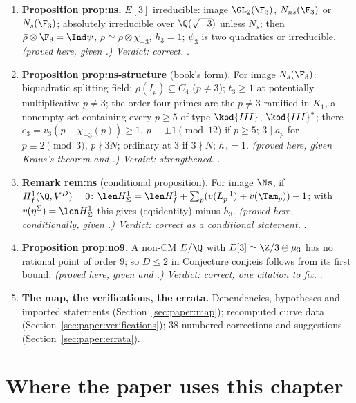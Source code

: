 \begin{sloppypar}
\begin{enumerate}[label=\textbf{\thechapter.\arabic*}]
{strengthened.} .
\item \textbf{Proposition prop:ns.} $E[3]$ irreducible: image $\GL_2(\F_3)$, $N_{ns}(\F_3)$ or $N_s(\F_3)$; absolutely irreducible over $\Q(\sqrt{-3})$ unless $N_s$; then $\bar\rho\otimes\F_9=\Ind\psi$, $\bar\rho\simeq\bar\rho\otimes\chi_{-3}$,
$h_3=1$; $\psi_3$ is two quadratics or irreducible. \emph{(proved here, given .) Verdict: correct.} .
\item \textbf{Proposition prop:ns-structure} (book's form). For image $N_s(\F_3)$: biquadratic splitting field; $\bar\rho(I_p)\subseteq C_4$ ($p\ne3$); $t_3\ge1$ at potentially multiplicative $p\ne3$; the order-four
primes are the $p\ne3$ ramified in $K_1$, a nonempty set containing every $p\ge5$ of type $\kod{III}$, $\kod{III}^*$; there $e_3=v_3(p-\chi_{-3}(p))\ge1$, $p\equiv\pm1\pmod{12}$ if $p\ge5$; $3\mid a_p$ for
$p\equiv2\pmod3$, $p\nmid3N$; ordinary at $3$ if $3\nmid N$; $h_3=1$. \emph{(proved here, given Kraus's theorem and .) Verdict: strengthened.} .
\item \textbf{Remark rem:ns} (conditional proposition). For image $\Ns$, if $H^1_f(\Q,V^D)=0$: $\len H^1_\Sigma=\len H^1_f+\sum_p(v(L_p^{-1})+v(\Tam_p))-1$; with $v(\eta^\Sigma)=\len H^1_\Sigma$ this gives (eq:identity)
minus $h_3$. \emph{(proved here, conditionally, given .) Verdict: correct as a conditional statement.} .
\item \textbf{Proposition prop:no9.} A non-CM $E/\Q$ with $E[3]\simeq\Z/3\oplus\mu_3$ has no rational point of order $9$; so $D\le2$ in Conjecture conj:eis follows from its first bound. \emph{(proved here,
given \cite{Ligozat75} and \cite{Mazur77}.) Verdict: correct; one citation to fix.} .
\item \textbf{The map, the verifications, the errata.} Dependencies, hypotheses and imported statements (Section~\ref{sec:paper:map}); recomputed curve data (Section~\ref{sec:paper:verifications});
$38$ numbered corrections and suggestions (Section~\ref{sec:paper:errata}).
\end{enumerate}

\section*{Where the paper uses this chapter}


\end{sloppypar}
